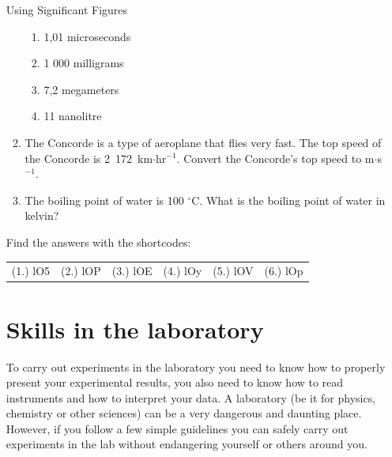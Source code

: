 \begin{enumerate}[label=\textbf{\arabic*}.]
\begin{exercises}{Using Significant Figures }
\begin{enumerate}[noitemsep, label=\textbf{\arabic*}. ]
\begin{enumerate}[noitemsep, label=\textbf{\alph*}. ]
  \item 1,01 microseconds
  \item 1 000 milligrams
  \item 7,2 megameters
  \item 11 nanolitre
  \end{enumerate}
  \item The Concorde is a type of aeroplane that flies very fast. The top speed of the Concorde is 2~172~km$\ensuremath{\cdot}$hr${}^{-1}$. Convert the Concorde's top speed to m$\ensuremath{\cdot}$s${}^{-1}$.        
  \item The boiling point of water is 100 ${}^{\circ }$C. What is the boiling point of water in kelvin?    
\end{enumerate}
\par {} Find the answers with the shortcodes:
 \par \begin{tabular}[h]{cccccc}
  (1.) lO5  &  (2.) lOP  &  (3.) lOE  &  (4.) lOy  &  (5.) lOV  &  (6.) lOp \end{tabular}
\end{exercises}

\section{Skills in the laboratory}
To carry out experiments in the laboratory you need to know how to properly present your experimental results, you also need to know how to read instruments and how to interpret your data. A laboratory (be it for physics, chemistry or other sciences) can be a very dangerous and daunting place. However, if you follow a few simple guidelines you can safely carry out experiments in the lab without endangering yourself or others around you.

\end{enumerate}
